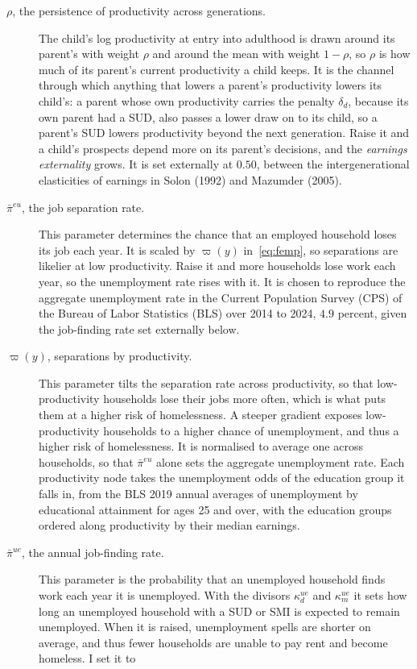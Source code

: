 \documentclass[10pt]{article}
\begin{document}
\begin{description}
\item[$\rho$, the persistence of productivity across generations.] The
child's log productivity at entry into adulthood is drawn around its parent's with weight $\rho$ and
around the mean with weight $1-\rho$, so $\rho$ is how much of its parent's current productivity a
child keeps. It is the channel through which anything that lowers a parent's productivity lowers its child's: a parent whose own productivity carries the penalty $\delta_d$, because its own parent had a SUD, also passes a lower draw on to its child, so a
parent's SUD lowers productivity beyond the next generation. Raise it and a child's prospects depend more
on its parent's decisions, and the \emph{earnings externality} grows. It is set
externally at $0.50$, between the intergenerational elasticities of earnings
in Solon (1992) and Mazumder (2005).
\item[$\bar\pi^{eu}$, the job separation rate.] This parameter determines the chance that an employed household
loses its job each year. It is scaled by $\varpi(y)$ in~\eqref{eq:femp}, so separations are likelier at low
productivity. Raise it and more households lose work each year, so the unemployment
rate rises with it. It is chosen to reproduce the aggregate
unemployment rate in the Current Population Survey (CPS) of the Bureau of Labor Statistics (BLS) over 2014 to 2024,
$4.9$ percent, given the job-finding rate set externally below.
\item[$\varpi(y)$, separations by productivity.] This parameter tilts the separation rate across
productivity, so that low-productivity households lose their jobs more often, which is what
puts them at a higher risk of homelessness.   A steeper gradient exposes low-productivity households to a higher chance of unemployment, and thus a higher risk of homelessness. It is normalised to average one across households, so
that $\bar\pi^{eu}$ alone sets the aggregate unemployment rate. Each productivity node takes the
unemployment odds of the education group it falls in, from the BLS 2019 annual averages of
unemployment by educational attainment for ages 25 and over, with the education groups ordered along productivity by their median earnings.
\item[$\bar\pi^{ue}$, the annual job-finding rate.] This parameter is the probability that an
unemployed household finds work each year it is unemployed. With the divisors $\kappa^{ue}_{d}$ and $\kappa^{ue}_{m}$ it sets how long an unemployed household with a SUD or SMI is expected to remain unemployed.  When it is raised, unemployment spells are shorter on average, and thus fewer households are unable to pay rent and become homeless. I set it to

\end{description}
\end{document}
